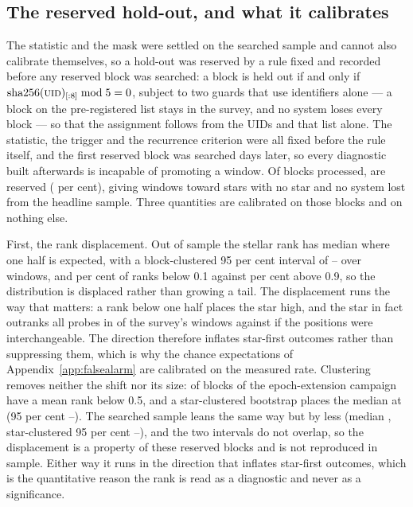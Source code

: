 \subsection{The reserved hold-out, and what it calibrates}
\label{sec:heldout}

The statistic and the mask were settled on the searched sample and cannot also
calibrate themselves, so a hold-out was reserved by a rule fixed and recorded
before any reserved block was searched: a block is held out if and only if
$\mathrm{sha256}(\textsc{uid})_{[:8]} \bmod 5 = 0$, subject to two guards that
use identifiers alone --- a block on the pre-registered list stays in the
survey, and no system loses every block --- so that the assignment follows
from the UIDs and that list alone. The
statistic, the trigger and the recurrence criterion were all fixed before the
rule itself, and the first reserved block was searched \HoLeadBlockDays{} days
later, so every diagnostic built afterwards is incapable of promoting a
window. Of \NEbProcessedAll{} blocks processed, \NEbHeldOut{} are reserved
(\HoPctHeld{} per cent), giving \HoWin{} windows toward \HoStars{} stars with
no star and no system lost from the headline sample. Three quantities are
calibrated on those blocks and on nothing else.

First, the rank displacement. Out of sample the stellar rank has median
\HoRankMed{} where one half is expected, with a block-clustered 95 per cent
interval of \HoRankMedLo--\HoRankMedHi{} over \HoWin{} windows, and
\HOFracLoPct{} per cent of ranks below 0.1 against \HOFracHiPct{} per cent
above 0.9, so the distribution is displaced rather than growing a tail. The
displacement runs the way that matters: a rank below one half places the star
high, and the star in fact outranks all \NCtrl{} probes in \NsrFirstObs{} of
the survey's windows against \NsrFirstExp{} if the positions were
interchangeable. The direction therefore inflates star-first outcomes rather
than suppressing them, which is why the chance expectations of
Appendix~\ref{app:falsealarm} are calibrated on the measured rate.
Clustering removes neither the shift nor its size: \HOBlockBelow{} of
\HOBlockN{} blocks of the epoch-extension campaign have a mean rank below
0.5, and a star-clustered bootstrap
places the median at \HOBootMed{} (95 per cent \HOBootLo--\HOBootHi). The
searched sample leans the same way but by less (median \SurvMedP,
star-clustered 95 per cent \SurvBootLo--\SurvBootHi), and the two
intervals do not overlap, so the displacement is a property of these
reserved blocks and is not reproduced in sample. Either way it runs in the
direction that inflates star-first outcomes, which is the quantitative
reason the rank is read as a diagnostic and never as a significance.

